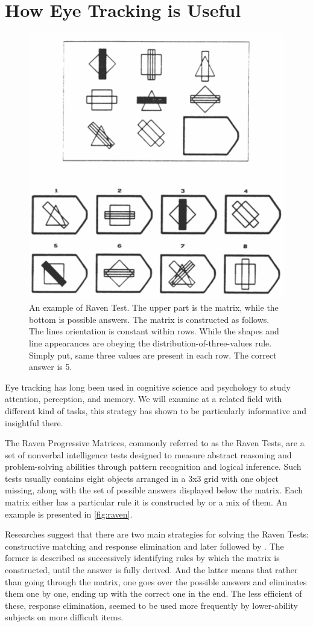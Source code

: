 \section{How Eye Tracking is Useful}
\begin{figure}
    \centering
    \includegraphics[width=0.5\linewidth]{images/raven_carpenter_1990.png}
    \caption{An example of Raven Test. The upper part is the matrix, while the bottom is possible answers. The matrix is constructed as follows. The lines orientation is constant within rows. While the shapes and line appearances are obeying the distribution-of-three-values rule. Simply put, same three values are present in each row. The correct answer is 5.}
    \label{fig:raven}
\end{figure}
Eye tracking has long been used in cognitive science and psychology to study attention, perception, and memory. We will examine at a related field with different kind of tasks, this strategy has shown to be particularly informative and insightful there. 

The Raven Progressive Matrices, commonly referred to as the Raven Tests, are a set of nonverbal intelligence tests designed to measure abstract reasoning and problem-solving abilities through pattern recognition and logical inference. Such tests usually contains eight objects arranged in a 3x3 grid with one object missing, along with the set of possible answers displayed below the matrix. Each matrix either has a particular rule it is constructed by or a mix of them. An example is presented in \autoref{fig:raven}. 

Researches suggest that there are two main strategies for solving the Raven Tests: constructive matching and response elimination \citep{Bethel-Fox_1984} and later followed by \cite{Vigneau_2006}. The former is described as successively identifying rules by which the matrix is constructed, until the answer is fully derived. And the latter means that rather than going through the matrix, one goes over the possible answers and eliminates them one by one, ending up with the correct one in the end. The less efficient of these, response elimination, seemed to be used more frequently by lower-ability subjects on more difficult items. 

